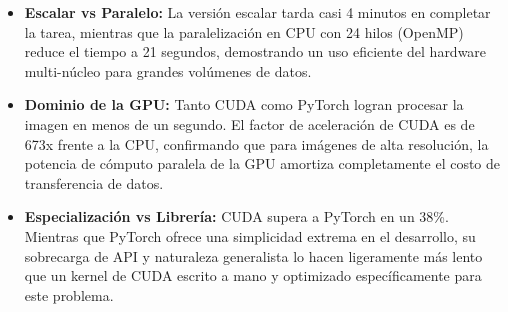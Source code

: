 \begin{itemize}
    \item \textbf{Escalar vs Paralelo:} La versión escalar tarda casi 4 minutos en completar la tarea, mientras que la paralelización en CPU con 24 hilos (OpenMP) reduce el tiempo a 21 segundos, demostrando un uso eficiente del hardware multi-núcleo para grandes volúmenes de datos.
    \item \textbf{Dominio de la GPU:} Tanto CUDA como PyTorch logran procesar la imagen en menos de un segundo. El factor de aceleración de CUDA es de 673x frente a la CPU, confirmando que para imágenes de alta resolución, la potencia de cómputo paralela de la GPU amortiza completamente el costo de transferencia de datos.
    \item \textbf{Especialización vs Librería:} CUDA supera a PyTorch en un 38\%. Mientras que PyTorch ofrece una simplicidad extrema en el desarrollo, su sobrecarga de API y naturaleza generalista lo hacen ligeramente más lento que un kernel de CUDA escrito a mano y optimizado específicamente para este problema.
\end{itemize}

\FloatBarrier